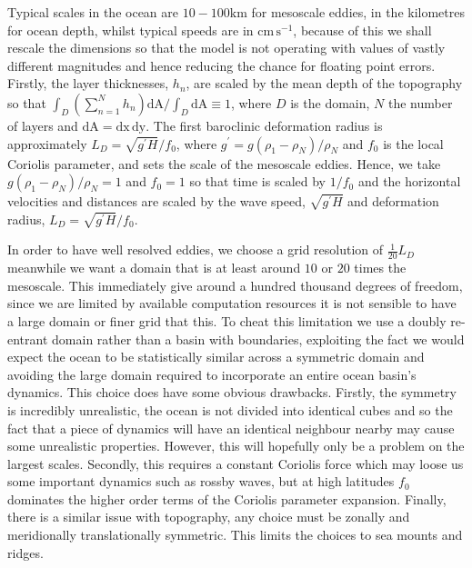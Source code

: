 \documentclass[12pt,a4paper]{report}
\begin{document}
  Typical scales in the ocean are $10 - 100 \mathrm{km}$ for mesoscale eddies,
  in the kilometres for ocean depth, whilst typical speeds are in
  $\mathrm{cm}\,\mathrm{s}^{-1}$, because of this we shall rescale the 
  dimensions so that the model is not operating with values of vastly different magnitudes
  and hence reducing the chance for floating point errors. Firstly, the layer thicknesses,
  $h_{n}$, are scaled by the mean depth of the topography so that 
  $ \int_{D} \left(\sum_{n=1}^{N} h_{n}\right)  \mathrm{ d A} / \int_{D} \mathrm{ d A} \equiv 1 $, 
  where $D$  is the domain, $N$ the number of layers and
  $ \mathrm{ d A} = \mathrm{ d x}\, \mathrm{ d y}$. 
  The first baroclinic deformation radius is approximately $L_{D}=\sqrt{g^{\prime}H}/f_{0}$,
  where ${g^{\prime}=g\left(\rho_{1}-\rho_{N}\right)}/\rho_{N}$ and $f_{0}$ is 
  the local Coriolis parameter, and sets the scale of the mesoscale eddies.
  Hence, we take ${g\left(\rho_{1}-\rho_{N}\right)}/\rho_{N} = 1 $
  and $f_{0}=1$ so that time is scaled by $1/f_{0}$ and the horizontal velocities and distances are scaled by the wave speed, $\sqrt{g^{\prime}H}$ and deformation radius, $L_{D}=\sqrt{g^{\prime}H}/f_{0}$.

  In order to have well resolved eddies, we choose a grid resolution of $\frac{1}{20} L_{D}$
  meanwhile we want a domain that is at least around $10$ or $20$ times the 
  mesoscale. This immediately give around a hundred thousand degrees of freedom,
  since we are limited by available computation resources it is not sensible
  to have a large domain or finer grid that this. To cheat this limitation
  we use a doubly re-entrant domain rather than a basin with boundaries, exploiting
  the fact we would expect the ocean to be statistically similar across a symmetric 
  domain and avoiding the large domain required to incorporate an entire ocean basin's
  dynamics. This choice does have some obvious drawbacks. Firstly, the symmetry is
  incredibly unrealistic, the ocean is not divided into identical cubes and so the 
  fact that a piece of dynamics will have an identical neighbour nearby may cause some
  unrealistic properties. However, this will hopefully only be a problem on the largest 
  scales. Secondly, this requires a constant Coriolis force which may loose
  us some important dynamics such as rossby waves, but at high latitudes $f_{0}$
  dominates the higher order terms of the Coriolis parameter expansion.
  Finally, there is a similar issue with topography, any choice must be
  zonally and meridionally translationally symmetric. This limits the choices to sea mounts and ridges.  
    
\end{document}
